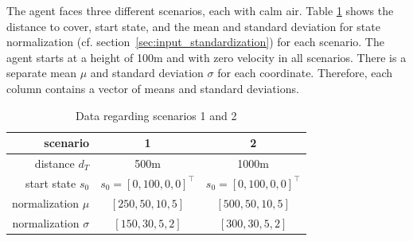 The agent faces three different scenarios, each with calm air. Table \ref{tab:scenario_data} shows the distance to cover, start state, and the mean and standard deviation for state normalization (cf. section~\ref{sec:input_standardization}) for each scenario. The agent starts at a height of 100m and with zero velocity in all scenarios. There is a separate mean $\mu$ and standard deviation $\sigma$ for each coordinate. Therefore, each column contains a vector of means and standard deviations.

\begin{table}[h]
	\begin{center}
		\begin{tabular}{r|c c}
			scenario & 1 & 2 \\ \hline
			distance $d_T$ & 500m & 1000m \\
			start state $s_0$ & $s_0 = [0, 100, 0, 0]^\top$ &  $s_0 = [0, 100, 0, 0]^\top$ \\
			normalization $\mu$ & $[250, 50, 10, 5]$  &$[500, 50, 10, 5]$ \\
			normalization $\sigma$ & $[150, 30, 5, 2]$ & $[300, 30, 5, 2]$
		\end{tabular}
		\caption{Data regarding scenarios 1 and 2}
		\label{tab:scenario_data}
	\end{center}
\end{table}
%

